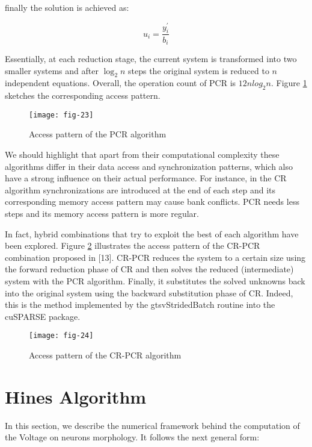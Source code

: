 finally the solution is achieved as:

\begin{equation}
    u_{i}=\frac{y_{i}^{\prime}}{b_{i}}
\end{equation}

Essentially, at each reduction stage, the current system is transformed into two smaller
systems and after $\log_2 n$ steps the original system is reduced to $n$ 
independent equations. Overall, the operation count of PCR is $12n log_2 n$. 
Figure \ref{fig:23} sketches the corresponding access pattern.

\vspace{5ex}
\begin{figure}[htbp]
    \centering
    \texttt{[image: fig-23]}
    \label{fig:23}
    \caption{Access pattern of the PCR algorithm}
\end{figure}

We should highlight that apart from their computational complexity these algorithms differ in their data access and synchronization patterns, which also have a strong
influence on their actual performance. For instance, in the CR algorithm synchronizations are introduced at the end of each step and its corresponding memory access
pattern may cause bank conflicts. PCR needs less steps and its memory access pattern
is more regular.

In fact, hybrid combinations that try to exploit the best of each algorithm have
been explored. Figure \ref{fig:24} illustrates the access pattern of the
CR-PCR combination proposed in [13]. CR-PCR reduces the system to a certain size
using the forward reduction phase of CR and then solves the reduced (intermediate)
system with the PCR algorithm. Finally, it substitutes the solved unknowns back into
the original system using the backward substitution phase of CR. Indeed, this is the
method implemented by the gtsvStridedBatch routine into the cuSPARSE package.

\vspace{5ex}
\begin{figure}[htbp]
    \centering
    \texttt{[image: fig-24]}
    \label{fig:24}
    \caption{Access pattern of the CR-PCR algorithm}
\end{figure}


\vspace{10ex}
\section{Hines Algorithm}
In this section, we describe the numerical framework behind the computation of the
Voltage on neurons morphology. It follows the next general form:

